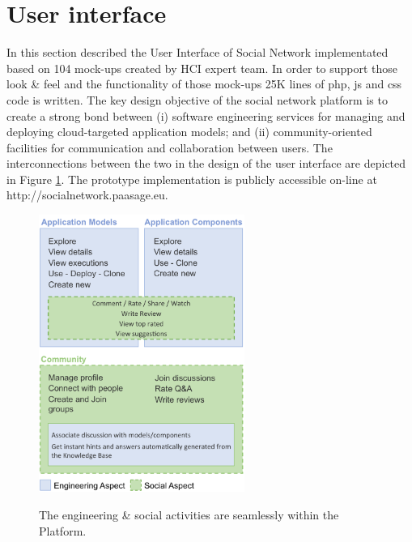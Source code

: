 \section{User interface}
In this section described the User Interface of Social Network implementated based on 104 mock-ups created by HCI expert team. In order to support those look \& feel and the functionality of those mock-ups 25K lines of php, js and css code is written.
The key design objective of the social network platform is to create a strong bond between (i) software engineering services for managing and deploying cloud-targeted application models; and (ii) community-oriented facilities for communication and
collaboration between users. The interconnections between the two in the design of the user interface are depicted in Figure \ref{fig:two_aspects}.
The prototype implementation is publicly accessible on-line at http://socialnetwork.paasage.eu. 

\begin{figure}[h]
	\caption{The engineering \& social activities are seamlessly within the Platform.}
	\includegraphics[width=0.6\textwidth,natwidth=200,natheight=150]{./fig/two_aspectes.png}
	\centering
	\label{fig:two_aspects}
\end{figure}

